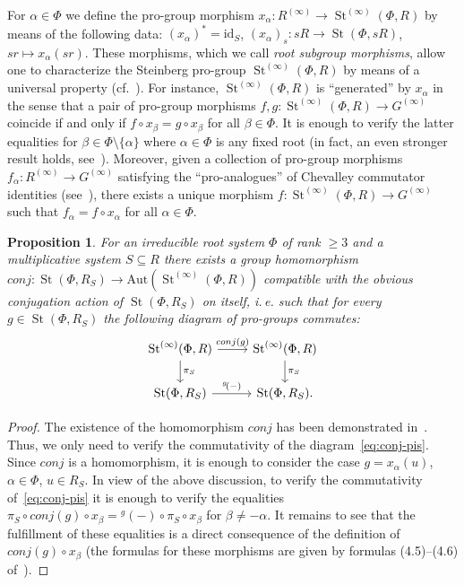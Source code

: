 \documentclass[oneside, 11pt]{amsart} \pdfoutput=1
\newcommand{\St}{\mathop{\mathrm{St}}\nolimits}
\numberwithin{equation}{section}
\newtheorem{prop}[lemma]{Proposition}
\theoremstyle{definition}
\begin{document}
For $\alpha \in \Phi$ we define the pro-group morphism $x_\alpha \colon R^{(\infty)} \to \St^{(\infty)}(\Phi, R)$ by means of the following data: $(x_\alpha)^* = \mathrm{id}_S$, $(x_\alpha)_s \colon sR \to \St(\Phi, sR)$, $sr \mapsto x_\alpha(sr)$. These morphisms, which we call {\it root subgroup morphisms}, allow one to characterize the Steinberg pro-group $\St^{(\infty)}(\Phi, R)$ by means of a universal property (cf.~\cite[Lemma~2.16]{LSV20}). For instance, $\St^{(\infty)}(\Phi, R)$ is ``generated'' by $x_\alpha$ in the sense that a pair of pro-group morphisms $f, g \colon \St^{(\infty)}(\Phi, R) \to G^{(\infty)}$ coincide if and only if $f \circ x_\beta = g \circ x_\beta$ for all $\beta \in \Phi$.
It is enough to verify the latter equalities for $\beta \in \Phi\setminus\{\alpha\}$ where $\alpha \in \Phi$ is any fixed root (in fact, an even stronger result holds, see~\cite[Lemma~3.2]{LSV20}).
Moreover, given a collection of pro-group morphisms $f_\alpha \colon R^{(\infty)} \to G^{(\infty)}$ satisfying the ``pro-analogues'' of Chevalley commutator identities (see~\cite[Remark~2.15]{LSV20}), there exists a unique morphism $f \colon \St^{(\infty)}(\Phi, R) \to G^{(\infty)}$ such that $f_\alpha = f \circ x_\alpha$ for all $\alpha\in\Phi$. 
\begin{prop}\label{prop:conj-action}
 For an irreducible root system $\Phi$ of rank $\geq 3$ and a multiplicative system $S\subseteq R$ there exists a group homomorphism $conj\colon \St(\Phi, R_S) \to \mathrm{Aut}(\St^{(\infty)}(\Phi, R))$ compatible with the obvious conjugation action of $\St(\Phi, R_S)$ on itself, i.\,e. such that for every $g \in \St(\Phi, R_S)$ the following diagram of pro-groups commutes:
 \begin{equation} \label{eq:conj-pis} \begin{tikzcd} \St^{(\infty)}(\Phi, R) \ar{r}{conj(g)} \ar{d}{\pi_S} & \St^{(\infty)}(\Phi, R) \ar{d}{\pi_S} \\ \St(\Phi, R_S) \ar{r}{{}^g\!(-)} & \St(\Phi, R_S). \end{tikzcd} \end{equation}
\end{prop}
\begin{proof}
The existence of the homomorphism $conj$ has been demonstrated in~\cite[Proposition~4.2]{LSV20}.
Thus, we only need to verify the commutativity of the diagram~\eqref{eq:conj-pis}. 
Since $conj$ is a homomorphism, it is enough to consider the case $g = x_\alpha(u)$, $\alpha \in \Phi$, $u \in R_S$. In view of the above discussion, to verify the commutativity of~\eqref{eq:conj-pis} it is enough to verify the equalities $\pi_S \circ conj(g) \circ x_\beta= {}^g\!(-) \circ \pi_S \circ x_\beta$ for $\beta\neq -\alpha$.
 It remains to see that the fulfillment of these equalities is a direct consequence of the definition of $conj(g) \circ x_\beta$ (the formulas for these morphisms are given by formulas (4.5)--(4.6) of~\cite{LSV20}). \end{proof}
\end{document}
